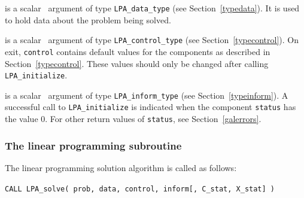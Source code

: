\documentclass{galahad}
\newcommand{\packagename}{LPA}
\begin{document}
\vspace*{-3mm}
\begin{description}

 is a scalar \intentinout\ argument of type
{\tt \packagename\_data\_type}
(see Section~\ref{typedata}). It is used to hold data about the problem being
solved.

 is a scalar \intentout\ argument of type
{\tt \packagename\_control\_type}
(see Section~\ref{typecontrol}).
On exit, {\tt control} contains default values for the components as
described in Section~\ref{typecontrol}.
These values should only be changed after calling
{\tt \packagename\_initialize}.

 is a scalar \intentout\ argument of type
{\tt \packagename\_inform\_type}
(see Section~\ref{typeinform}). A successful call to
{\tt \packagename\_initialize}
is indicated when the  component {\tt status} has the value 0.
For other return values of {\tt status}, see Section~\ref{galerrors}.

\end{description}


\subsubsection{The linear programming subroutine}\label{qps}
The linear programming solution algorithm is called as follows:
\vspace*{1mm}

\hspace{8mm}
{\tt CALL \packagename\_solve( prob, data, control, inform[, C\_stat, X\_stat] )}
\end{document}
